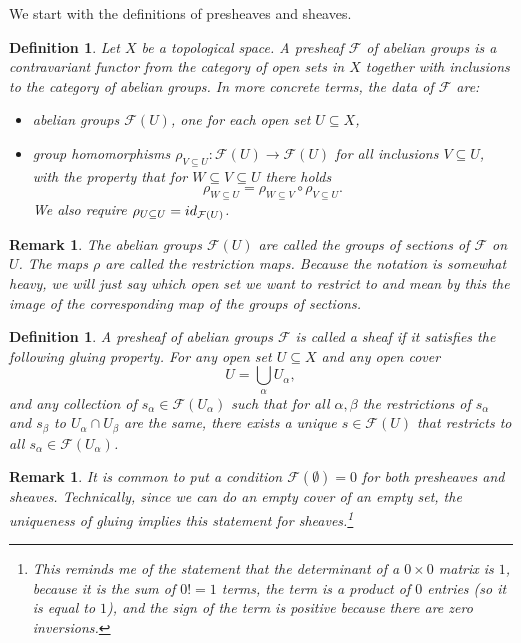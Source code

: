 \documentclass[11pt]{article}
\numberwithin{equation}{section}
\numberwithin{footnote}{section}
\newtheorem{defn}[thm]{Definition}
\newtheorem{rem}[thm]{Remark}
\newcommand{\blue}{\color{blue}}
\begin{document}
\smallskip
We start with the definitions of presheaves and sheaves.
\begin{defn}\label{presheaf}
Let $X$ be a topological space. A {\blue presheaf} $\mathcal F$ of abelian groups is a contravariant functor from the category of open sets in $X$ together with inclusions to the category of abelian groups. In more concrete terms, the data of  $\mathcal F$ are:
\begin{itemize}
\item abelian groups $\mathcal F(U)$, one for each open set $U\subseteq X$,
\item group homomorphisms $\rho_{V\subseteq U}:\mathcal F(U) \to\mathcal F(U) $
for all inclusions $V\subseteq U$,
with the property that for $W\subseteq V\subseteq U$ there holds 
$$\rho_{W\subseteq U}= \rho_{W\subseteq V}\circ\rho_{V\subseteq U}.$$
We also require $\rho_{U\subseteq U}={\rm id}_{\mathcal F(U)}$.
\end{itemize}
\end{defn}

\smallskip
\begin{rem}
The abelian groups ${\mathcal F(U)}$ are called the groups of sections of $\mathcal F$ on $U$.
The maps $\rho$ are called the {\blue restriction maps}. Because the notation is somewhat heavy, we will just say which open set we want to restrict to and mean by this the image of the corresponding map of the groups of sections.
\end{rem}

\smallskip
\begin{defn}\label{sheaf}
A presheaf of abelian groups $\mathcal F$ is called a {\blue sheaf} if it satisfies the following gluing property. For any open set $U\subseteq X$ and any open cover
$$
U = \bigcup_\alpha U_\alpha,
$$
and any collection of $s_\alpha\in \mathcal F(U_\alpha)$ such that for all $\alpha,\beta$ the restrictions of $s_\alpha$ and $s_\beta$ to $U_\alpha \cap U_\beta$ are the same, there exists a unique $s\in \mathcal F(U)$ that restricts to all $s_\alpha\in \mathcal F(U_\alpha)$.
\end{defn}

\smallskip
\begin{rem}
It is common to put a condition $\mathcal F(\emptyset) = 0$ for both presheaves and sheaves. Technically, since we can do an empty cover of an empty set, the uniqueness of gluing implies this statement for sheaves.\footnote{ This reminds me of the statement that the determinant of a $0\times 0$ matrix is $1$, because it is the sum of $0!=1$ terms, the term is a product of $0$ entries (so it is equal to $1$), and the sign of the term is positive because there are zero inversions.}
\end{rem}
\end{document}

